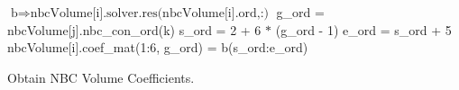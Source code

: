 %
%

\begin{algo}[ht!]
\setlength{\baselineskip}{0.625\baselineskip}
\begin{algorithmic}[1]
	\Set $\text{b} \Rightarrow \text{nbcVolume[i].solver.res(nbcVolume[i].ord,:)}$
			\Set g\_ord = nbcVolume[j].nbc\_con\_ord(k)
			\Set s\_ord = 2 + 6 $*$ (g\_ord - 1)
			\Set e\_ord = s\_ord + 5
			\Set nbcVolume[i].coef\_mat(1:6, g\_ord) = b(s\_ord:e\_ord)
		\EndFor
	\EndFor
\EndFor
\end{algorithmic}
\caption{Obtain NBC Volume Coefficients.}
\label{alg:domDecompGetCoef}
\end{algo}

